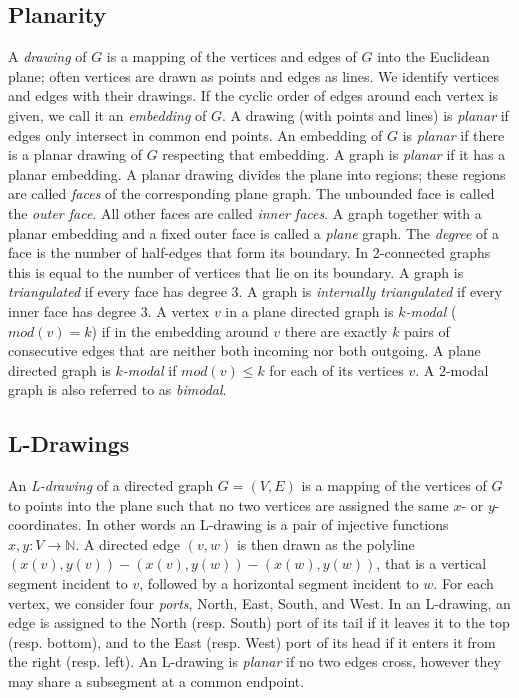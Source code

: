 \documentclass[a4paper]{article}
\begin{document}
\subsection{Planarity}
A \emph{drawing} of $G$ is a mapping of the vertices and edges of $G$ into the
Euclidean plane; often vertices are drawn as points and edges as lines.
We identify vertices and edges with their drawings.
If the cyclic order of edges around each vertex is given, we call it an
\emph{embedding} of $G$.
A drawing (with points and lines) is \emph{planar} if edges only intersect in
common end points.
An embedding of $G$ is \emph{planar} if there is a planar drawing of $G$
respecting that embedding.
A graph is \emph{planar} if it has a planar embedding.
A planar drawing divides the plane into regions; these regions are called
\emph{faces} of the corresponding plane graph.
The unbounded face is called the \emph{outer face}.
All other faces are called \emph{inner faces}.
A graph together with a planar embedding and a fixed outer face is called a
\emph{plane} graph.
The \emph{degree} of a face is the number of half-edges that form its boundary.
In 2-connected graphs this is equal to the number of vertices that lie on its
boundary.
A graph is \emph{triangulated} if every face has degree $3$.
A graph is \emph{internally triangulated} if every inner face has degree
$3$.
A vertex $v$ in a plane directed graph is \emph{$k$-modal} ($mod(v) = k$) if in
the embedding around $v$ there are exactly $k$ pairs of consecutive edges that
are neither both incoming nor both outgoing.
A plane directed graph is \emph{$k$-modal} if $mod(v) \leq k$ for each of its
vertices $v$.
A $2$-modal graph is also referred to as \emph{bimodal}.

\subsection{L-Drawings}
An \emph{L-drawing} of a directed graph $G = (V,E)$ is a mapping of the vertices
of $G$ to points into the plane such that no two vertices are assigned the same
$x$- or $y$-coordinates.
In other words an L-drawing is a pair of injective functions $x,y : V \to
\mathbb N$.
A directed edge $(v,w)$ is then drawn as the polyline $(x(v),y(v)) - (x(v),y(w))
- (x(w),y(w))$, that is a vertical segment incident to $v$, followed by a
horizontal segment incident to $w$.
For each vertex, we consider four \emph{ports}, North, East, South, and West.
In an L-drawing, an edge is assigned to the North (resp. South) port of its tail
if it leaves it to the top (resp. bottom), and to the East (resp. West) port of
its head if it enters it from the right (resp. left).
An L-drawing is \emph{planar} if no two edges cross, however they may share a
subsegment at a common endpoint.
\end{document}

